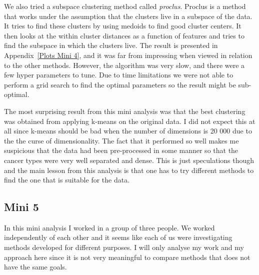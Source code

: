 \documentclass[11pt,twoside,swedish]{article}
\begin{document}
We also tried a subspace clustering method called
\emph{proclus}. Proclus is a method that works under the assumption
that the clusters live in a subspace of the data. It tries to find
these clusters by using medoids to find good cluster centers. It then
looks at the within cluster distances as a function of features and
tries to find the subspace in which the clusters live. The result is
presented in Appendix~\ref{Plots Mini 4}, and it was far from
impressing when viewed in relation to the other methods. However, the
algorithm was very slow, and there were a few hyper parameters to
tune. Due to time limitations we were not able to perform a grid
search to find the optimal parameters so the result might be
sub-optimal.  

\begin{table}[]
\centering
{}
\label{mini 4 summary}
\caption{Summary of results}
\end{table}

The most surprising result from this mini analysis was that the best
clustering was obtained from applying k-means on the original data. I
did not expect this at all since k-means should be bad when the number
of dimensions is 20 000 due to the the curse of dimensionality. The
fact that it performed so well makes me suspicious that the data had
been pre-processed in some manner so that the cancer types were
very well separated and dense. This is just speculations though and
the main lesson from this analysis is that one has to try different
methods to find the one that is suitable for the data.

\subsection{Mini 5}\label{Mini 5}

In this mini analysis I worked in a group of three people. We worked
independently of each other and it seems like each of us were
investigating methods developed for different purposes. I will only
analyse my work and my approach here since it is not very meaningful
to compare methods that does not have the same goals.
\end{document}
